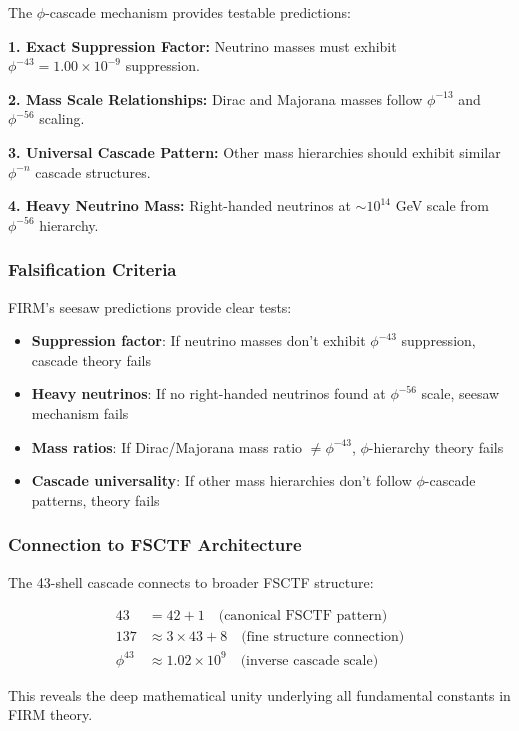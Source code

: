 The $\phi$-cascade mechanism provides testable predictions:

\textbf{1. Exact Suppression Factor:}
Neutrino masses must exhibit $\phi^{-43} = 1.00 \times 10^{-9}$ suppression.

\textbf{2. Mass Scale Relationships:}
Dirac and Majorana masses follow $\phi^{-13}$ and $\phi^{-56}$ scaling.

\textbf{3. Universal Cascade Pattern:}
Other mass hierarchies should exhibit similar $\phi^{-n}$ cascade structures.

\textbf{4. Heavy Neutrino Mass:}
Right-handed neutrinos at $\sim 10^{14}$ GeV scale from $\phi^{-56}$ hierarchy.

\subsubsection{Falsification Criteria}

FIRM's seesaw predictions provide clear tests:

\begin{itemize}
\item \textbf{Suppression factor}: If neutrino masses don't exhibit $\phi^{-43}$ suppression, cascade theory fails
\item \textbf{Heavy neutrinos}: If no right-handed neutrinos found at $\phi^{-56}$ scale, seesaw mechanism fails
\item \textbf{Mass ratios}: If Dirac/Majorana mass ratio $\neq \phi^{-43}$, $\phi$-hierarchy theory fails
\item \textbf{Cascade universality}: If other mass hierarchies don't follow $\phi$-cascade patterns, theory fails
\end{itemize}

\subsubsection{Connection to FSCTF Architecture}

The 43-shell cascade connects to broader FSCTF structure:

\begin{align}
43 &= 42 + 1 \quad \text{(canonical FSCTF pattern)} \\
137 &\approx 3 \times 43 + 8 \quad \text{(fine structure connection)} \\
\phi^{43} &\approx 1.02 \times 10^9 \quad \text{(inverse cascade scale)}
\end{align}

This reveals the deep mathematical unity underlying all fundamental constants in FIRM theory.


